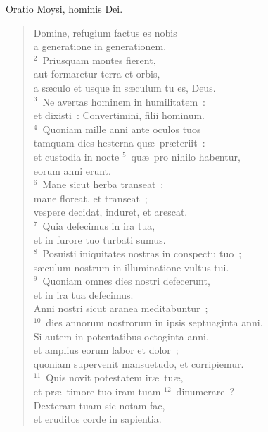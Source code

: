 \lettrine[lines=3,image=true,loversize=0.05,lraise=-0.03]{O}{}ratio Moysi, hominis Dei. \begin{flushleft}\begin{verse}\vspace{6pt}Domine, refugium factus es nobis\\ a generatione in generationem.\\
${}^{2}$~Priusquam montes fierent,\\ aut formaretur terra et orbis,\\ a s\ae culo et usque in s\ae culum tu es, Deus.\\
${}^{3}$~Ne avertas hominem in humilitatem~:\\ et dixisti~: Convertimini, filii hominum.\\
${}^{4}$~Quoniam mille anni ante oculos tuos\\ tamquam dies hesterna qu\ae\ pr\ae teriit~:\\ et custodia in nocte
${}^{5}$~qu\ae\ pro nihilo habentur,\\ eorum anni erunt.\\
${}^{6}$~Mane sicut herba transeat~;\\ mane floreat, et transeat~;\\ vespere decidat, induret, et arescat.\\
${}^{7}$~Quia defecimus in ira tua,\\ et in furore tuo turbati sumus.\\
${}^{8}$~Posuisti iniquitates nostras in conspectu tuo~;\\ s\ae culum nostrum in illuminatione vultus tui.\\
${}^{9}$~Quoniam omnes dies nostri defecerunt,\\ et in ira tua defecimus.\\ Anni nostri sicut aranea meditabuntur~;\\
${}^{10}$~dies annorum nostrorum in ipsis septuaginta anni.\\ Si autem in potentatibus octoginta anni,\\ et amplius eorum labor et dolor~;\\ quoniam supervenit mansuetudo, et corripiemur.\\
${}^{11}$~Quis novit potestatem ir\ae\ tu\ae ,\\ et pr\ae\ timore tuo iram tuam
${}^{12}$~dinumerare~?\\ Dexteram tuam sic notam fac,\\ et eruditos corde in sapientia.\\

\end{verse}
\end{flushleft}
